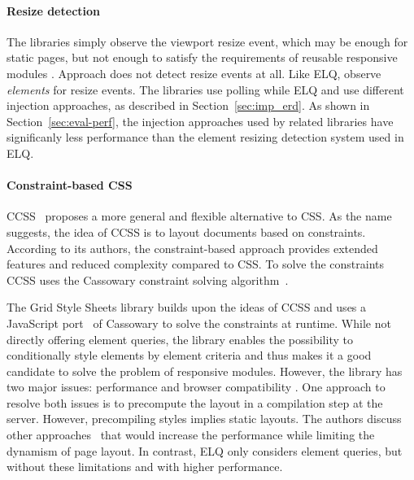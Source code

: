 \documentclass{acm_proc_article-sp}
\newcommand{\elq}{ELQ}
\newcommand{\gls}[1]{#1}
\begin{document}
  \paragraph{Resize detection}
  The libraries \cite{eq_imp_eqcss,eq_imp_breakpointsjs,eq_imp_mediaclass,eq_imp_elementquery,eq_imp_responsive-elements,eq_imp_sickles,eq_imp_responsive-elements-2,eq_imp_breaks2000,eq_imp_eqjs} simply observe the \gls{viewport} resize event, which may be enough for static pages, but not enough to satisfy the requirements of reusable responsive modules \cite{elq-thesis}.
  Approach \cite{eq_imp_classquery} does not detect resize events at all.
  Like \elq{}, \cite{eq_imp_localised-css,eq_imp_selector_queries,eq_imp_prollyfill-min-width,eq_imp_gss,eq_imp_element-queries,eq_imp_css-element-queries} observe \emph{elements} for resize events.
  The libraries \cite{eq_imp_localised-css,eq_imp_selector_queries} use polling while \elq{} and \cite{eq_imp_prollyfill-min-width,eq_imp_gss,eq_imp_element-queries,eq_imp_css-element-queries} use different injection approaches, as described in Section~\ref{sec:imp_erd}.
  As shown in Section~\ref{sec:eval-perf}, the injection approaches used by related libraries have significanly less performance than the element resizing detection system used in \gls{ELQ}.

  \paragraph{Constraint-based CSS}
  CCSS~\cite{badros1999constraint} proposes a more general and flexible alternative to CSS.
  As the name suggests, the idea of \gls{CCSS} is to layout documents based on constraints.
  According to its authors, the constraint-based approach provides extended features and reduced complexity compared to CSS.
  To solve the constraints CCSS uses the Cassowary constraint solving algorithm~\cite{BadrosBS01}.

  The Grid Style Sheets library \cite{eq_imp_gss} builds upon the ideas of \gls{CCSS} and uses a \gls{JavaScript} port~\cite{cassowary_js} of Cassowary to solve the constraints at runtime.
  While not directly offering element queries, the library enables the possibility to conditionally style elements by \gls{element} criteria and thus makes it a good candidate to solve the problem of \gls{responsive} modules.
  However, the library has two major issues: performance and browser compatibility \cite{gss_issue}.
  One approach to resolve both issues is to precompute the layout in a compilation step at the server.
  However, precompiling styles implies static layouts.
  The authors discuss other approaches~\cite{gss_issue} that would increase the performance while limiting the dynamism of page layout.
  In contrast, \elq{} only considers element queries, but without these limitations and with higher performance.
\end{document}
